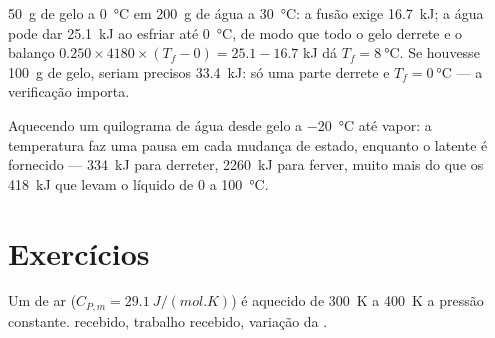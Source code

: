 \begin{example}\label{ex:b1:first-law:ice}
\qty{50}{g} de gelo a \qty{0}{\degreeCelsius} em \qty{200}{g} de água a
\qty{30}{\degreeCelsius}: a fusão exige \qty{16.7}{kJ}; a água pode dar
\qty{25.1}{kJ} ao esfriar até \qty{0}{\degreeCelsius}, de modo que todo o gelo
derrete e o balanço $0.250 \times 4180 \times (T_f - 0) = 25.1 - 16.7$ kJ dá
$T_f = \qty{8}{\degreeCelsius}$. Se houvesse \qty{100}{g} de gelo, seriam
precisos \qty{33.4}{kJ}: só uma parte derrete e $T_f = \qty{0}{\degreeCelsius}$
--- a verificação importa.
\end{example}

\begin{omfigure}

{\small Aquecendo um quilograma de água desde gelo a \qty{-20}{\degreeCelsius}
até vapor: a temperatura faz uma pausa em cada mudança de estado, enquanto
o  latente é fornecido --- \qty{334}{kJ} para derreter, \qty{2260}{kJ} para
ferver, muito mais do que os \qty{418}{kJ} que levam o líquido de \qty{0}{} a
\qty{100}{\degreeCelsius}.}
\end{omfigure}

\section{Exercícios}

\begin{exercise}[$\star$]\label{exo:b1:first-law:1}
Um  de ar ($C_{P,m} = \qty{29.1}{J/(mol.K)}$) é aquecido de
\qty{300}{K} a \qty{400}{K} a pressão constante.  recebido, trabalho
recebido, variação da .
\end{exercise}

